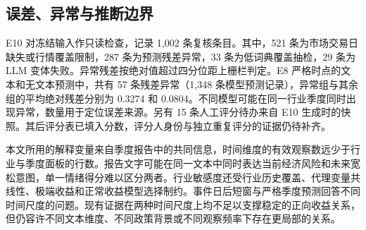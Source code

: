 \subsection{误差、异常与推断边界}

E10 对冻结输入作只读检查，记录 1,002 条复核条目。其中，521 条为市场交易日缺失或行情覆盖限制，287 条为预测残差异常，33 条为低词典覆盖抽检，29 条为 LLM 变体失败。异常残差按绝对值超过四分位距上栅栏判定。E8 严格时点的文本和无文本预测中，共有 57 条残差异常（1,348 条模型预测记录），异常组与其余组的平均绝对残差分别为 0.3274 和 0.0804。不同模型可能在同一行业季度同时出现异常，数量用于定位误差来源。另有 15 条人工评分待办来自 E10 生成时的快照。其后评分表已填入分数，评分人身份与独立重复评分的证据仍待补齐。

本文所用的解释变量来自季度报告中的共同信息，时间维度的有效观察数远少于行业与季度面板的行数。报告文字可能在同一文本中同时表达当前经济风险和未来宽松意图，单一情绪得分难以区分两者。行业敏感度还受行业历史覆盖、代理变量共线性、极端收益和正常收益模型选择制约。事件日后短窗与严格季度预测回答不同时间尺度的问题。现有证据在两种时间尺度上均不足以支撑稳定的正向收益关系，但仍容许不同文本维度、不同政策背景或不同观察频率下存在更局部的关系。
